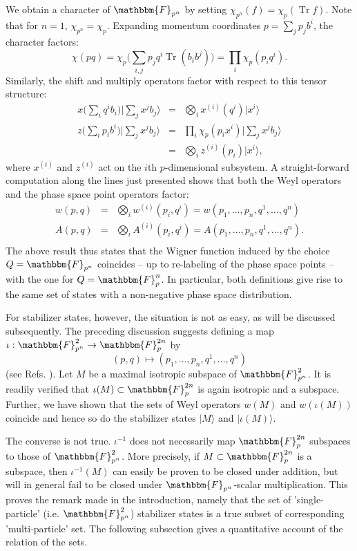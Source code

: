 \documentclass[aps,twocolumn,floatfix]{revtex4}
\def\ket#1.{|#1\rangle}
\def\FF{\mathbbm{F}}
\DeclareMathOperator{\Tr}{Tr}
\begin{document}
We obtain a character of $\FF_{p^n}$ by setting
$\chi_{p^n}(f)=\chi_p(\Tr f)$. Note that for $n=1$,
$\chi_{p^n}=\chi_p$.  Expanding momentum coordinates $p=\sum_j p_j
b^i$, the character factors:
\begin{equation*}
	\chi(p q) 
	= \chi_p\big(\sum_{i,j} p_j q^i \Tr(b_i b^j)\big)
	= \prod_i \chi_p(p_i q^i).
\end{equation*}
Similarly, the shift and multiply operators factor with respect to
this tensor structure:
\begin{eqnarray*}
	x\big( \sum_i q^i b_i \big) \ket \sum_j x^j b_j.
	&=& \bigotimes_i x^{(i)}(q^i) \ket x^i. \\
	z\big( \sum_i p_i b^i \big) \ket \sum_j x^j b_j. 
	&=& \prod_i \chi_{p}(p_i x^i) \ket \sum_j x^j b_j. \\
	&=& \bigotimes_i z^{(i)}(p_i) \ket x^i., \nonumber
\end{eqnarray*}
where $x^{(i)}$ and $z^{(i)}$ act on the $i$th $p$-dimensional
subsystem. A straight-forward computation along the lines just
presented shows that both the Weyl operators and the phase space point
operators factor:
\begin{eqnarray*}
	w(p,q)
	&=&\bigotimes_i w^{(i)}(p_i,q^i)
	=w(p_1, \dots, p_n, q^1, \dots, q^n) \\
	A(p,q)
	&=&\bigotimes_i A^{(i)}(p_i,q^i)
	=A(p_1, \dots, p_n, q^1, \dots, q^n). \\
\end{eqnarray*}
The above result thus states that the Wigner function induced by the
choice $Q=\FF_{p^n}$ coincides -- up to re-labeling of the phase space
points -- with the one for $Q=\FF_p^n$. In particular, both
definitions give rise to the same set of states with a non-negative
phase space distribution. 

For stabilizer states, however, the situation is not as easy, as will
be discussed subsequently. The preceding discussion suggests defining
a map $\iota: \FF_{p^n}^2 \to \FF_p^{2n}$ by 
\begin{equation*}
	(p,q)\mapsto (p_1, \dots, p_n, q^1, \dots, q^n)
\end{equation*}
(see Refs. \cite{diploma,pittenger}). Let $M$ be a maximal isotropic
subspace of $\FF_{p^n}^2$. It is readily verified that
$\iota(M)\subset \FF_p^{2n}$ is again isotropic and a subspace.
Further, we have shown that the sets of Weyl operators $w(M)$ and
$w(\iota(M))$ coincide and hence so do the stabilizer states $\ket M.$
and $\ket \iota(M).$.

The converse is not true. $\iota^{-1}$ does not necessarily map
$\FF_p^{2n}$ subspaces to those of $\FF_{p^n}^2$. More precisely, if $M\subset
\FF_p^{2n}$ is a subspace, then $\iota^{-1}(M)$ can easily be proven
to be closed under addition, but will in general fail to be closed
under $\FF_{p^n}$-scalar multiplication. This proves the remark made
in the introduction, namely that the set of 'single-particle' (i.e.
$\FF_{p^n}^2$) stabilizer states is a true subset of corresponding 
'multi-particle' set. The following subsection gives a quantitative
account of the relation of the sets.
\end{document}
